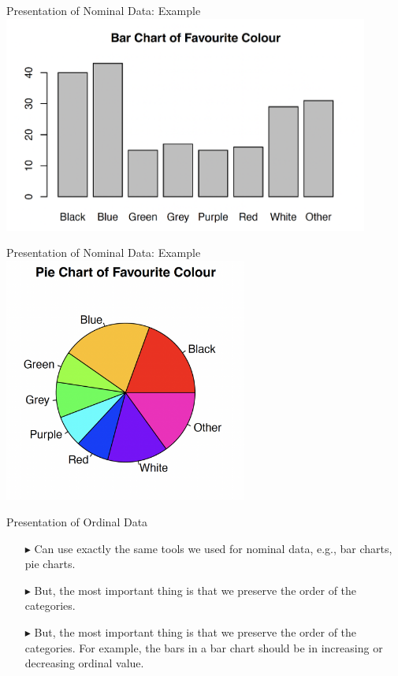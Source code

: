 \documentclass[12pt]{beamer}
\begin{document}
\begin{frame}{Presentation of Nominal Data: Example}
\centering
\includegraphics[width=12cm]{bar.png}
\end{frame}
\begin{frame}{Presentation of Nominal Data: Example}
	\centering
	\includegraphics[width=8cm]{pie.png}
\end{frame}
\begin{frame}{Presentation of Ordinal Data}
	\begin{itemize}
	\item[$\blacktriangleright$] Can use exactly the same tools we used for nominal data, e.g., bar charts, pie charts.
	\item[$\blacktriangleright$] But, the most important thing is that we preserve the order of the categories.
	\item[$\blacktriangleright$] But, the most important thing is that we preserve the order of the categories.
	For example, the bars in a bar chart should be in increasing or decreasing ordinal value.
\end{itemize}
\end{frame}
\end{document}
